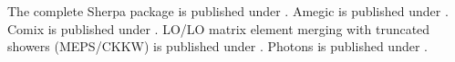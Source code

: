 \documentclass{article}
\begin{document}
The complete Sherpa package is published under \cite{Gleisberg:2008ta}.
Amegic is published under \cite{Krauss:2001iv}.
Comix is published under \cite{Gleisberg:2008fv}.
LO/LO matrix element merging with truncated showers (MEPS/CKKW) is published under \cite{Hoeche:2009rj}.
Photons is published under \cite{Schonherr:2008av}.
\end{document}
